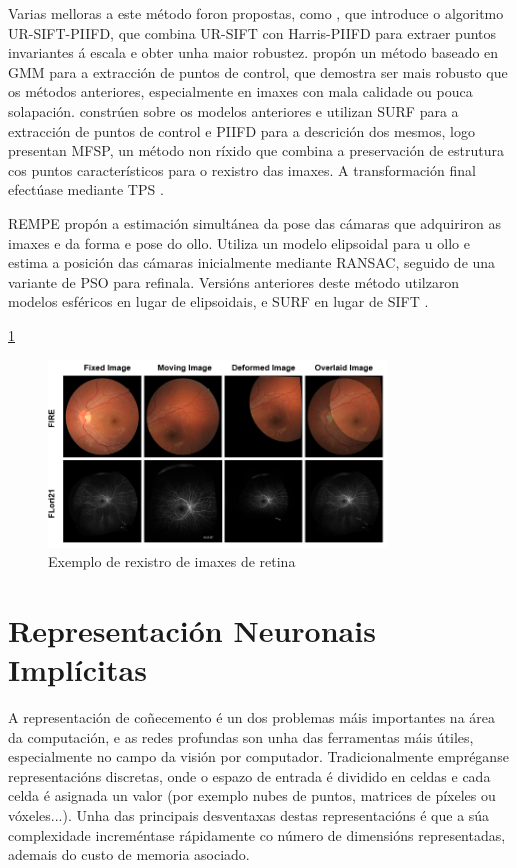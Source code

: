 Varias melloras a este método foron propostas, como \cite{ur-sift}, que introduce o algoritmo \gls{UR-SIFT-PIIFD}, que combina UR-SIFT con Harris-PIIFD para extraer puntos invariantes á escala e obter unha maior robustez.
\cite{GMM} propón un método baseado en \gls{GMM} para a extracción de puntos de control, que demostra ser mais robusto que os métodos anteriores, especialmente en imaxes con mala calidade ou pouca solapación.
\cite{MFSP} constrúen sobre os modelos anteriores e utilizan \gls{SURF} para a extracción de puntos de control e \gls{PIIFD} para a descrición dos mesmos, 
logo presentan \gls{MFSP}, un método non ríxido que combina a preservación de estrutura cos puntos característicos para o rexistro das imaxes. 
A transformación final efectúase mediante \gls{TPS} \cite{TPS}.

\gls{REMPE} \cite{rempe} propón a estimación simultánea da pose das cámaras que adquiriron as imaxes e da forma e pose do ollo. Utiliza un modelo elipsoidal para u ollo e estima a posición das cámaras inicialmente mediante RANSAC, seguido de una variante de \gls{PSO} \cite{pso} para refinala. 
Versións anteriores deste método utilzaron modelos esféricos en lugar de elipsoidais, e \gls{SURF} en lugar de SIFT \cite{H-M16}.


\ref{fig:retin_reg}
\begin{figure}[hp!]
    \centering
    \includegraphics[width=0.8\textwidth]{imaxes/retin-reg.png}
    \caption{Exemplo de rexistro de imaxes de retina \cite{sivaraman2024retinaregnetzeroshotapproachretinal}}
    \label{fig:retin_reg}
\end{figure}

\section{Representación Neuronais Implícitas}
\label{sec:Representación Neuronais Implícitas}
 
A representación de coñecemento é un dos problemas máis importantes na área da computación, e as 
redes profundas son unha das ferramentas máis útiles, especialmente no campo da visión por computador.
Tradicionalmente empréganse representacións discretas, onde o espazo de entrada é dividido en celdas e cada celda é asignada un valor (por exemplo nubes de puntos, matrices de píxeles ou vóxeles...).
Unha das principais desventaxas destas representacións é que a súa complexidade increméntase rápidamente co número de dimensións representadas, ademais do custo de memoria asociado.

